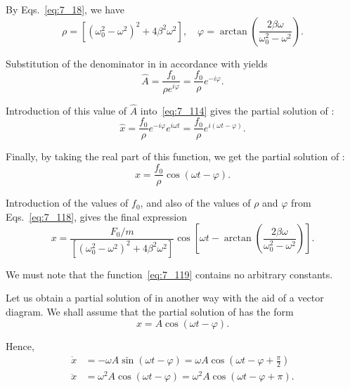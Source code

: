 \noindent
By Eqs.~\eqref{eq:7_18}, we have
\begin{equation}\label{eq:7_118}
	\rho = \left[\left(\omega_0^2 - \omega^2\right)^2 + 4\beta^2\omega^2\right],\quad  \varphi = \arctan\left(\frac{2\beta\omega}{\omega_0^2 - \omega^2}\right).
\end{equation}

Substitution of the denominator in  in accordance with  yields
\begin{equation*}
	\hat{A} = \frac{f_0}{\rho e^{i\varphi}} = \frac{f_0}{\rho}e^{-i\varphi}.
\end{equation*}

\noindent
Introduction of this value of $\hat{A}$ into~\eqref{eq:7_114} gives the partial solution of :
\begin{equation*}
	\hat{x} = \frac{f_0}{\rho} e^{-i\varphi} e^{i\omega t} = \frac{f_0}{\rho} e^{i(\omega t-\varphi)}.
\end{equation*}

\noindent
Finally, by taking the real part of this function, we get the partial solution of :
\begin{equation*}
	x = \frac{f_0}{\rho} \cos(\omega t-\varphi).
\end{equation*}

\noindent
Introduction of the values of $f_0$, and also of the values of $\rho$ and $\varphi$ from Eqs.~\eqref{eq:7_118}, gives the final expression
\begin{equation}\label{eq:7_119}
	x = \frac{F_0/m}{\left[\left(\omega_0^2 - \omega^2\right)^2 + 4\beta^2\omega^2\right]}\cos\left[\omega t - \arctan\left(\frac{2\beta\omega}{\omega_0^2 - \omega^2}\right)\right].
\end{equation}

\noindent
We must note that the function~\eqref{eq:7_119} contains no arbitrary constants.

Let us obtain a partial solution of  in another way with the aid of a vector diagram. We shall assume that the partial solution of  has the form
\vspace{-12pt}
\begin{equation}\label{eq:7_120}
	x = A\cos(\omega t - \varphi).
\end{equation}

\noindent
Hence,
\begin{align}
	\dot{x} &= -\omega A\sin(\omega t - \varphi) = \omega A\cos\left(\omega t - \varphi + \frac{\pi}{2}\right)\label{eq:7_121}\\
	\ddot{x} &= \omega^2 A\cos(\omega t - \varphi) = \omega^2 A\cos(\omega t - \varphi + \pi)\label{eq:7_122}.
\end{align}

